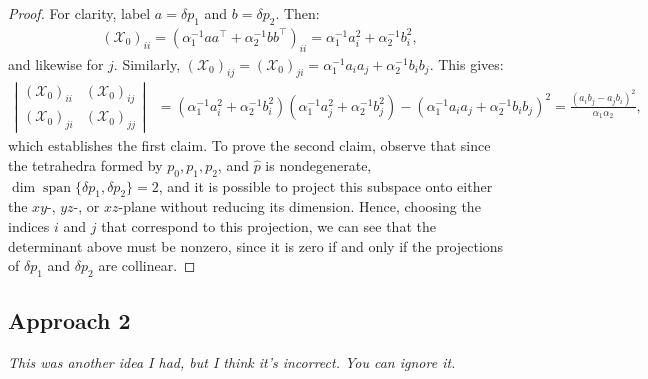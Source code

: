 \documentclass{article}
\begin{document}
\begin{proof}
  For clarity, label $a = \delta p_1$ and $b = \delta p_2$. Then:
  \begin{align*}
    {(\mathcal{X}_0)}_{ii} = {(\alpha_1^{-1} aa^\top + \alpha_2^{-1} bb^\top)}_{ii} = \alpha_1^{-1} a_i^2 + \alpha_2^{-1} b_i^2,
  \end{align*}
  and likewise for $j$. Similarly,
  ${(\mathcal{X}_0)}_{ij} = {(\mathcal{X}_0)}_{ji} = \alpha_1^{-1} a_i
  a_j + \alpha_2^{-1} b_i b_j$. This gives:
  \begin{align*}
    \left|\begin{matrix}
      {(\mathcal{X}_0)}_{ii} & {(\mathcal{X}_0)}_{ij} \\
      {(\mathcal{X}_0)}_{ji} & {(\mathcal{X}_0)}_{jj}
    \end{matrix}\right| &= {(\alpha_1^{-1} a_i^2 + \alpha_2^{-1} b_i^2)}{(\alpha_1^{-1} a_j^2 + \alpha_2^{-1} b_j^2)} - {(\alpha_1^{-1} a_ia_j + \alpha_2^{-1} b_ib_j)}^2 = \frac{{(a_ib_j - a_jb_i)}^2}{\alpha_1 \alpha_2},
  \end{align*}
  which establishes the first claim. To prove the second claim,
  observe that since the tetrahedra formed by $p_0, p_1, p_2$, and
  $\hat{p}$ is nondegenerate,
  $\dim \operatorname{span}\{\delta p_1, \delta p_2\} = 2$, and it is
  possible to project this subspace onto either the $xy$-, $yz$-, or
  $xz$-plane without reducing its dimension. Hence, choosing the
  indices $i$ and $j$ that correspond to this projection, we can see
  that the determinant above must be nonzero, since it is zero if and
  only if the projections of $\delta p_1$ and $\delta p_2$ are
  collinear.
\end{proof}

\subsection*{Approach 2}

\noindent \emph{This was another idea I had, but I think it's incorrect. You can ignore it.} \\
\end{document}
